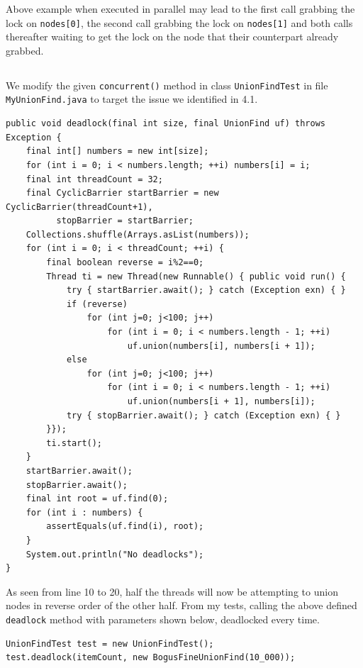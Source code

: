 \documentclass[a5paper]{article}
\begin{document}
Above example when executed in parallel may lead to the first call grabbing the lock on \texttt{nodes[0]}, the second call grabbing the lock on \texttt{nodes[1]} and both calls thereafter waiting to get the lock on the node that their counterpart already grabbed.

\subsection{}
We modify the given \texttt{concurrent()} method in class \texttt{UnionFindTest} in file \texttt{MyUnionFind.java} to target the issue we identified in 4.1.
\begin{lstlisting}
public void deadlock(final int size, final UnionFind uf) throws Exception {
    final int[] numbers = new int[size];
    for (int i = 0; i < numbers.length; ++i) numbers[i] = i;
    final int threadCount = 32;
    final CyclicBarrier startBarrier = new CyclicBarrier(threadCount+1), 
          stopBarrier = startBarrier;
    Collections.shuffle(Arrays.asList(numbers));
    for (int i = 0; i < threadCount; ++i) {
        final boolean reverse = i%2==0;
        Thread ti = new Thread(new Runnable() { public void run() {
            try { startBarrier.await(); } catch (Exception exn) { }
            if (reverse)
                for (int j=0; j<100; j++)
                    for (int i = 0; i < numbers.length - 1; ++i) 
                        uf.union(numbers[i], numbers[i + 1]);
            else 
                for (int j=0; j<100; j++)
                    for (int i = 0; i < numbers.length - 1; ++i) 
                        uf.union(numbers[i + 1], numbers[i]);
            try { stopBarrier.await(); } catch (Exception exn) { }
        }});
        ti.start();
    }
    startBarrier.await();
    stopBarrier.await();
    final int root = uf.find(0);
    for (int i : numbers) {
        assertEquals(uf.find(i), root);
    }
    System.out.println("No deadlocks");
}
\end{lstlisting}

As seen from line 10 to 20, half the threads will now be attempting to union nodes in reverse order of the other half.
From my tests, calling the above defined \texttt{deadlock} method with parameters shown below, deadlocked every time.

\begin{lstlisting}
UnionFindTest test = new UnionFindTest();
test.deadlock(itemCount, new BogusFineUnionFind(10_000));
\end{lstlisting}
\end{document}
